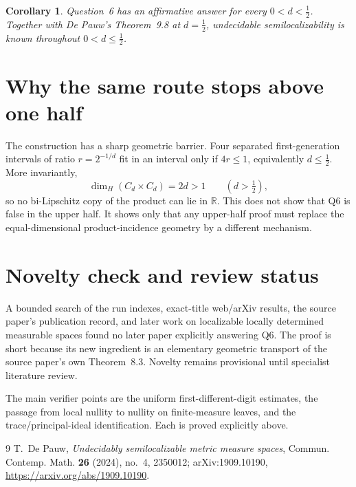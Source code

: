 \documentclass[11pt]{article}
\newtheorem{corollary}{Corollary}
\newcommand{\R}{\mathbb{R}}
\begin{document}
\begin{corollary}
Question~6 has an affirmative answer for every $0<d<\frac12$.  Together with
De Pauw's Theorem~9.8 at $d=\frac12$, undecidable semilocalizability is known
throughout $0<d\leq\frac12$.
\end{corollary}

\section*{Why the same route stops above one half}

The construction has a sharp geometric barrier.  Four separated
first-generation intervals of ratio $r=2^{-1/d}$ fit in an interval only if
$4r\leq1$, equivalently $d\leq\frac12$.  More invariantly,
\[
 \dim_H(C_d\times C_d)=2d>1\qquad(d>\tfrac12),
\]
so no bi-Lipschitz copy of the product can lie in $\R$.  This does not show
that Q6 is false in the upper half.  It shows only that any upper-half proof
must replace the equal-dimensional product-incidence geometry by a different
mechanism.

\section*{Novelty check and review status}

A bounded search of the run indexes, exact-title web/arXiv results, the source
paper's publication record, and later work on localizable locally determined
measurable spaces found no later paper explicitly answering Q6.  The proof is
short because its new ingredient is an elementary geometric transport of the
source paper's own Theorem~8.3.  Novelty remains provisional until specialist
literature review.

The main verifier points are the uniform first-different-digit estimates,
the passage from local nullity to nullity on finite-measure leaves, and the
trace/principal-ideal identification.  Each is proved explicitly above.

\begin{thebibliography}{9}
T.~De Pauw,
\emph{Undecidably semilocalizable metric measure spaces},
Commun. Contemp. Math. \textbf{26} (2024), no.~4, 2350012;
arXiv:1909.10190,
\url{https://arxiv.org/abs/1909.10190}.
\end{thebibliography}
\end{document}
